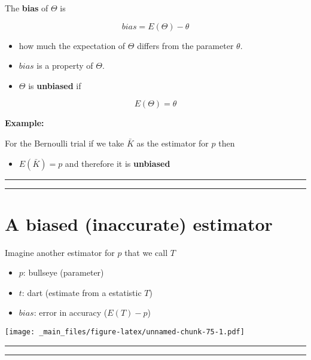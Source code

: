 \documentclass[
]{book}
\providecommand{\tightlist}{%
  \setlength{\itemsep}{0pt}\setlength{\parskip}{0pt}}
\begin{document}
The \textbf{bias} of \(\Theta\) is

\[bias=E(\Theta)-\theta\]

\begin{itemize}
\item
  how much the expectation of \(\Theta\) differs from the parameter \(\theta\).
\item
  \(bias\) is a property of \(\Theta\).
\item
  \(\Theta\) is \textbf{unbiased} if
\end{itemize}

\[E(\Theta)=\theta\]

\textbf{Example:}

For the Bernoulli trial if we take \(\bar{K}\) as the estimator for \(p\) then

\begin{itemize}
\tightlist
\item
  \(E(\bar{K})=p\) and therefore it is \textbf{unbiased}
\end{itemize}

\begin{center}\rule{0.5\linewidth}{0.5pt}\end{center}

\begin{center}\rule{0.5\linewidth}{0.5pt}\end{center}

\hypertarget{a-biased-inaccurate-estimator}{%
\section{A biased (inaccurate) estimator}\label{a-biased-inaccurate-estimator}}

Imagine another estimator for \(p\) that we call \(T\)

\begin{itemize}
\tightlist
\item
  \(p\): bullseye (parameter)
\item
  \(t\): dart (estimate from a estatistic \(T\))
\item
  \(bias\): error in accuracy (\(E(T)-p\))
\end{itemize}

\texttt{[image: \_main\_files/figure-latex/unnamed-chunk-75-1.pdf]}

\begin{center}\rule{0.5\linewidth}{0.5pt}\end{center}

\begin{center}\rule{0.5\linewidth}{0.5pt}\end{center}
\end{document}
